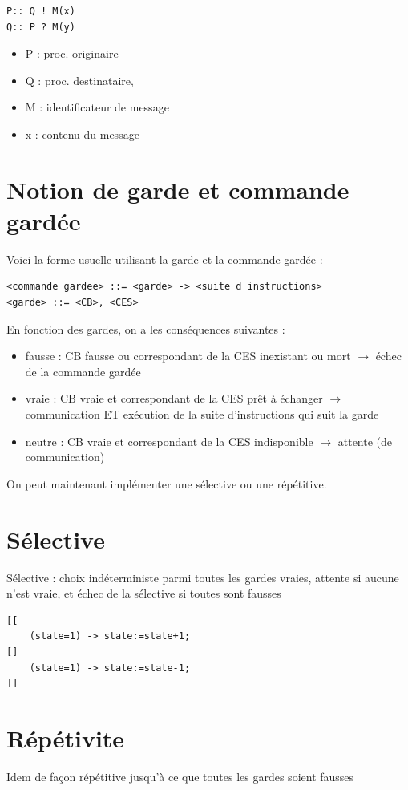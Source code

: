 \documentclass[a4paper,11pt,french]{report}
\begin{document}
\begin{lstlisting}[frame=trBL]
P:: Q ! M(x)
Q:: P ? M(y)
\end{lstlisting}
 \begin{itemize}
 \item P : proc. originaire
 \item Q : proc. destinataire,
 \item M : identificateur de message
 \item x : contenu du message
 \end{itemize}
 
 \section{Notion de garde et commande gardée}
 Voici la forme usuelle utilisant la garde et la commande gardée :
 
 \begin{lstlisting}[frame=trBL]
<commande gardee> ::= <garde> -> <suite d instructions>
<garde> ::= <CB>, <CES>
\end{lstlisting}

En fonction des gardes, on a les conséquences suivantes :
\begin{itemize}
\item fausse : CB fausse ou correspondant de la CES inexistant ou
mort $\rightarrow$ échec de la commande gardée
\item vraie : CB vraie et correspondant de la CES prêt à échanger $\rightarrow$ communication ET exécution de la suite d’instructions qui suit
la garde
\item neutre : CB vraie et correspondant de la CES indisponible $\rightarrow$
attente (de communication)
\end{itemize}

On peut maintenant implémenter une sélective ou une répétitive.

\section{Sélective}
Sélective : choix indéterministe parmi toutes les gardes vraies,
attente si aucune n’est vraie, et échec de la sélective si toutes
sont fausses

 \begin{lstlisting}[frame=trBL]
[[
	(state=1) -> state:=state+1;
[]
	(state=1) -> state:=state-1;
]]
\end{lstlisting}

 \section{Répétivite}
 Idem de façon répétitive jusqu’à ce que toutes les
gardes soient fausses
\end{document}
